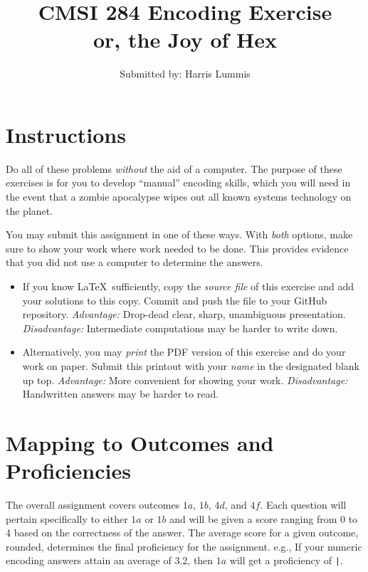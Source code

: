 \documentclass[11pt]{article}
\title{CMSI 284 Encoding Exercise\\
or, the Joy of Hex}
\author{Submitted by: Harris Lummis}
\date{}
\begin{document}
\maketitle


\section*{Instructions}

Do all of these problems \emph{without} the aid of a computer. The purpose of these exercises
is for you to develop ``manual'' encoding skills, which you will need in the event that a
zombie apocalypse wipes out all known systems technology on the planet.

You may submit this assignment in one of these ways. With \emph{both} options, make sure to
show your work where work needed to be done. This provides evidence that you did not use a
computer to determine the answers.

\begin{itemize}
\item If you know \LaTeX\ sufficiently, copy the \emph{source file} of this exercise and add your
solutions to this copy. Commit and push the file to your GitHub repository. \emph{Advantage:}
Drop-dead clear, sharp, unambiguous presentation. \emph{Disadvantage:} Intermediate computations
may be harder to write down.

\item Alternatively, you may \emph{print} the PDF version of this exercise and do your work on
paper. Submit this printout with your \emph{name} in the designated blank up top. \emph{Advantage:}
More convenient for showing your work. \emph{Disadvantage:} Handwritten answers may be harder to
read.
\end{itemize}


\section*{Mapping to Outcomes and Proficiencies}

The overall assignment covers outcomes \(1a\), \(1b\), \(4d\), and \(4f\). Each question will
pertain specifically to either \(1a\) or \(1b\) and will be given a score ranging from 0 to 4
based on the correctness of the answer. The average score for a given outcome, rounded,
determines the final proficiency for the assignment. e.g., If your numeric encoding answers
attain an average of 3.2, then \(1a\) will get a proficiency of \texttt{|}.
\end{document}
